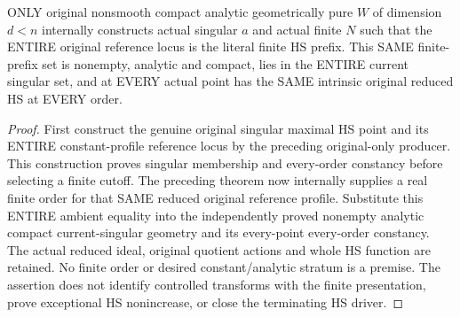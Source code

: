 \begin{theorem}
\label{hir:actual-original-constant-maximal-singular-finite-hs-prefix}
\leanok
ONLY original nonsmooth compact analytic geometrically pure $W$ of
dimension $d<n$ internally constructs actual singular $a$ and actual
finite $N$ such that the ENTIRE original reference locus is the literal
finite HS prefix. This SAME finite-prefix set is nonempty, analytic and
compact, lies in the ENTIRE current singular set, and at EVERY actual
point has the SAME intrinsic original reduced HS at EVERY order.
\end{theorem}
\begin{proof}
First construct the genuine original singular maximal HS point and its
ENTIRE constant-profile reference locus by the preceding original-only
producer. This construction proves singular membership and every-order
constancy before selecting a finite cutoff. The preceding theorem now
internally supplies a real finite order for that SAME reduced original
reference profile. Substitute this ENTIRE ambient equality into the
independently proved nonempty analytic compact current-singular geometry
and its every-point every-order constancy. The actual reduced ideal,
original quotient actions and whole HS function are retained. No finite
order or desired constant/analytic stratum is a premise. The assertion
does not identify controlled transforms with the finite presentation,
prove exceptional HS nonincrease, or close the terminating HS driver.
\end{proof}
